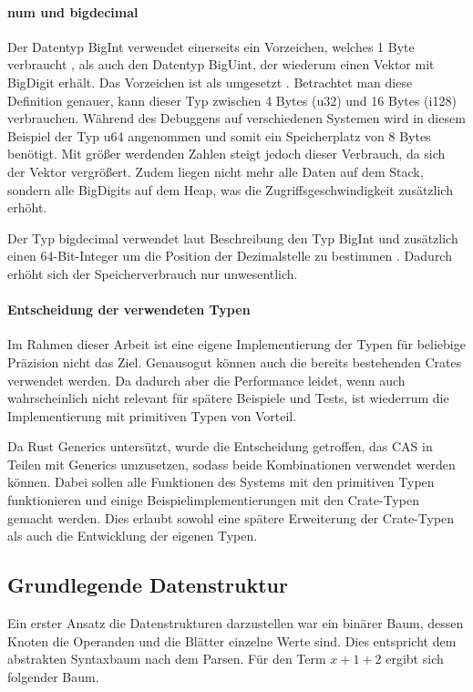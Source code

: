 \documentclass[11pt,a4paper, ngerman]{article}
\begin{document}
\paragraph{num und bigdecimal} Der Datentyp BigInt verwendet einerseits ein Vorzeichen, welches 1 Byte verbraucht \cite{EnumSize}, als auch den Datentyp BigUint, der wiederum einen Vektor mit BigDigit erhält. Das Vorzeichen ist als  umgesetzt \cite{BigIntSign}. Betrachtet man diese Definition genauer, kann dieser Typ zwischen 4 Bytes (u32) und 16 Bytes (i128) verbrauchen. Während des Debuggens auf verschiedenen Systemen wird in diesem Beispiel der Typ u64 angenommen und somit ein Speicherplatz von 8 Bytes benötigt. Mit größer werdenden Zahlen steigt jedoch dieser Verbrauch, da sich der Vektor vergrößert. Zudem liegen nicht mehr alle Daten auf dem Stack, sondern alle BigDigits auf dem Heap, was die Zugriffsgeschwindigkeit zusätzlich erhöht.

Der Typ bigdecimal verwendet laut Beschreibung den Typ BigInt und zusätzlich einen 64-Bit-Integer um die Position der Dezimalstelle zu bestimmen \cite{CrateBigdecimalDocs}. Dadurch erhöht sich der Speicherverbrauch nur unwesentlich.

\paragraph{Entscheidung der verwendeten Typen} Im Rahmen dieser Arbeit ist eine eigene Implementierung der Typen für beliebige Präzision nicht das Ziel. Genausogut können auch die bereits bestehenden Crates verwendet werden. Da dadurch aber die Performance leidet, wenn auch wahrscheinlich nicht relevant für spätere Beispiele und Tests, ist wiederrum die Implementierung mit primitiven Typen von Vorteil.

Da Rust Generics untersützt, wurde die Entscheidung getroffen, das CAS in Teilen mit Generics umzusetzen, sodass beide Kombinationen verwendet werden können. Dabei sollen alle Funktionen des Systems mit den primitiven Typen funktionieren und einige Beispielimplementierungen mit den Crate-Typen gemacht werden. Dies erlaubt sowohl eine spätere Erweiterung der Crate-Typen als auch die Entwicklung der eigenen Typen.

\subsection{Grundlegende Datenstruktur}
Ein erster Ansatz die Datenstrukturen darzustellen war ein binärer Baum, dessen Knoten die Operanden und die Blätter einzelne Werte sind. Dies entspricht dem abstrakten Syntaxbaum nach dem Parsen. Für den Term $x+1+2$ ergibt sich folgender Baum.
\end{document}
